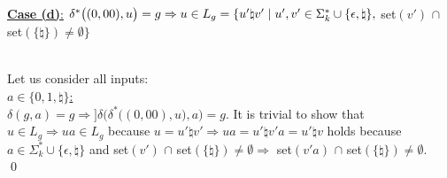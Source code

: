 \documentclass[11pt]{article}
\begin{document}
\newpage
\ \\
\underline{\textbf{Case (d)}:} $\delta^*\big((0,00),u\big)=g\Rightarrow u\in L_g=\{u'\natural v'\hspace{1mm}|\hspace{1mm}u',v'\in\Sigma_k^*\cup\{\epsilon,\natural\},$ set$(v')$ $\cap$ set$(\{\natural\})\neq\emptyset\}$
\begin{addmargin}[2em]{0em}
\ \\
Let us consider all inputs: \\
\underline{$a\in\{0,1,\natural\}$:} \\
$\delta(g,a)=g\Rightarrow]\delta\Big(\delta^*\big((0,00),u\big),a\Big)=g$. It is trivial to show that $u\in L_g\Rightarrow ua\in L_g$ because $u=u'\natural v'\Rightarrow ua=u'\natural v'a=u'\natural v$ holds because $a\in\Sigma_k^*\cup \{\epsilon,\natural\}$ and set$(v')$ $\cap$ set$(\{\natural\})\neq\emptyset\Rightarrow$ set$(v'a)$ $\cap$ set$(\{\natural\})\neq\emptyset$. \\ \qed
\end{addmargin}
\end{document}
